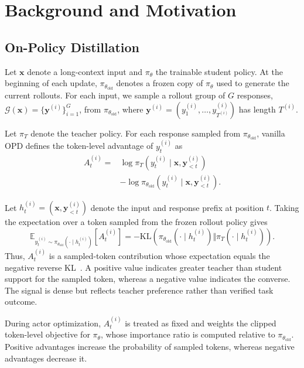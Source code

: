 \section{Background and Motivation}

\subsection{On-Policy Distillation}

Let $\mathbf{x}$ denote a long-context input and $\pi_\theta$ the trainable student policy. At the beginning of each update, $\pi_{\theta_{\mathrm{old}}}$ denotes a frozen copy of $\pi_\theta$ used to generate the current rollouts. For each input, we sample a rollout group of $G$ responses, $\mathcal{G}(\mathbf{x})=\{\mathbf{y}^{(i)}\}_{i=1}^{G}$, from $\pi_{\theta_{\mathrm{old}}}$, where $\mathbf{y}^{(i)}=(y^{(i)}_1,\ldots,y^{(i)}_{T^{(i)}})$ has length $T^{(i)}$.

Let $\pi_T$ denote the teacher policy. For each response sampled from $\pi_{\theta_{\mathrm{old}}}$, vanilla OPD defines the token-level advantage of $y_t^{(i)}$ as
\begin{equation}
\begin{aligned}
A^{(i)}_t={}&
\log \pi_T(y^{(i)}_t \mid \mathbf{x},\mathbf{y}^{(i)}_{<t})\\
&-\log \pi_{\theta_{\mathrm{old}}}(y^{(i)}_t \mid \mathbf{x},\mathbf{y}^{(i)}_{<t}).
\end{aligned}
\label{eq:opd-token-advantage}
\end{equation}

Let $h_t^{(i)}=(\mathbf{x},\mathbf{y}^{(i)}_{<t})$ denote the input and response prefix at position $t$. Taking the expectation over a token sampled from the frozen rollout policy gives
\begin{equation}
\mathbb{E}_{y_t^{(i)}\sim\pi_{\theta_{\mathrm{old}}}(\cdot\mid h_t^{(i)})}
\!\left[A_t^{(i)}\right]
=
-\mathrm{KL}\!\left(
\pi_{\theta_{\mathrm{old}}}(\cdot\mid h_t^{(i)})\Vert\pi_T(\cdot\mid h_t^{(i)})
\right).
\label{eq:opd-reverse-kl}
\end{equation}
Thus, $A_t^{(i)}$ is a sampled-token contribution whose expectation equals the negative reverse KL~\citep{gu2024minillm,zhao2026poweropd}. A positive value indicates greater teacher than student support for the sampled token, whereas a negative value indicates the converse. The signal is dense but reflects teacher preference rather than verified task outcome.

During actor optimization, $A_t^{(i)}$ is treated as fixed and weights the clipped token-level objective for $\pi_\theta$, whose importance ratio is computed relative to $\pi_{\theta_{\mathrm{old}}}$. Positive advantages increase the probability of sampled tokens, whereas negative advantages decrease it.

